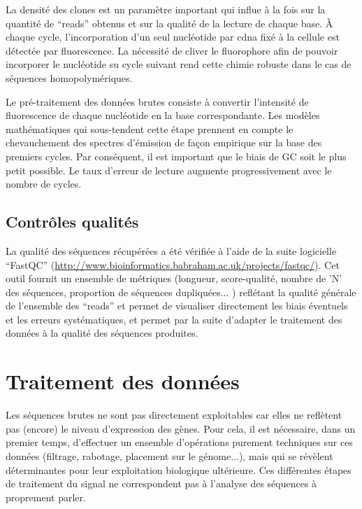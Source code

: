 \documentclass[../main.tex]{subfiles}
\begin{document}
		La densité des clones est un paramètre important qui influe à la fois sur la quantité de ``reads'' obtenus et sur la qualité de la lecture de chaque base.
		À chaque cycle, l'incorporation d'un seul nucléotide par \gls{cdna} fixé à la cellule est détectée par fluorescence.
		La nécessité de cliver le fluorophore afin de pouvoir incorporer le nucléotide su cycle suivant rend cette chimie robuste dans le cas de séquences homopolymériques.
		\par
		Le pré-traitement des données brutes consiste à convertir l'intensité de fluorescence de chaque nucléotide en la base correspondante.
		Les modèles mathématiques qui sous-tendent cette étape prennent en compte le chevauchement des spectres d'émission de façon empirique sur la base des premiers cycles.
		Par conséquent, il est important que le biais de GC soit le plus petit possible.
		Le taux d'erreur de lecture augmente progressivement avec le nombre de cycles.

	\subsection{Contrôles qualités}
		La qualité des séquences récupérées a été vérifiée à l'aide de la suite logicielle ``FastQC'' (\url{http://www.bioinformatics.babraham.ac.uk/projects/fastqc/}).
		Cet outil fournit un ensemble de métriques (longueur, score-qualité, nombre de 'N' des séquences, proportion de séquences dupliquées... ) reflétant la qualité générale de l'ensemble des ``reads'' et permet de visualiser directement les biais éventuels et les erreurs systématiques, et permet par la suite d'adapter le traitement des données à la qualité des séquences produites.




\section{Traitement des données}
	Les séquences brutes ne sont pas directement exploitables car elles ne reflètent pas (encore) le niveau d'expression des gènes.
	Pour cela, il est nécessaire, dans un premier temps, d'effectuer un ensemble d'opérations purement techniques sur ces données (filtrage, rabotage, placement sur le génome...), mais qui se révèlent déterminantes pour leur exploitation biologique ultérieure.
	Ces différentes étapes de traitement du signal ne correspondent pas à l'analyse des séquences à proprement parler. 
\end{document}

